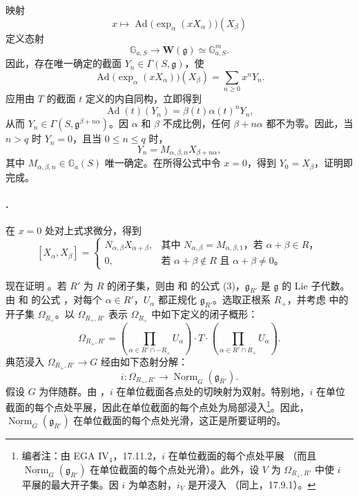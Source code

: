 映射
\[
  x\longmapsto
  \operatorname{Ad}\bigl(\exp_\alpha(xX_\alpha)\bigr)(X_\beta)
\]
定义态射
\[
  \mathbb G_{a,S}\longrightarrow
  \mathbf W(\mathfrak g)\simeq\mathbb G_{a,S}^{m}.
\]
因此，存在唯一确定的截面 \(Y_n\in\Gamma(S,\mathfrak g)\)，使
\[
  \operatorname{Ad}\bigl(\exp_\alpha(xX_\alpha)\bigr)(X_\beta)
  =
  \sum_{n\geq0}x^nY_n.
\]
应用由 \(T\) 的截面 \(t\) 定义的内自同构，立即得到
\[
  \operatorname{Ad}(t)(Y_n)
  =
  \beta(t)\alpha(t)^nY_n,
\]
从而 \(Y_n\in\Gamma(S,\mathfrak g^{\beta+n\alpha})\)。因 \(\alpha\) 和 \(\beta\) 不成比例，任何 \(\beta+n\alpha\) 都不为零。因此，当 \(n>q\) 时 \(Y_n=0\)，且当 \(0\leq n\leq q\) 时，
\[
  Y_n=M_{\alpha,\beta,n}X_{\beta+n\alpha},
\]
其中 \(M_{\alpha,\beta,n}\in\mathbb G_a(S)\) 唯一确定。在所得公式中令 \(x=0\)，得到 \(Y_0=X_\beta\)，证明即完成。

\paragraph{.}
在 \(x=0\) 处对上式求微分，得到
\[
  [X_\alpha,X_\beta]
  =
  \begin{cases}
    N_{\alpha,\beta}X_{\alpha+\beta},
      &\text{其中 \(N_{\alpha,\beta}=M_{\alpha,\beta,1}\)，若
        \(\alpha+\beta\in R\)，}\\
    0,
      &\text{若 \(\alpha+\beta\notin R\) 且
        \(\alpha+\beta\ne0\)。}
  \end{cases}
\]

现在证明 。若 \(R'\) 为 \(R\) 的闭子集，则由  和 的公式 \textup{(3)}，\(\mathfrak g_{R'}\) 是 \(\mathfrak g\) 的 Lie 子代数。由  和 的公式 \textup{}，对每个 \(\alpha\in R'\)，\(U_\alpha\) 都正规化 \(\mathfrak g_{R'}\)。选取正根系 \(R_+\)，并考虑  中的开子集 \(\Omega_{R_+}\)。以 \(\Omega_{R_+,R'}\) 表示 \(\Omega_{R_+}\) 中如下定义的闭子概形：
\[
  \Omega_{R_+,R'}
  =
  \left(
    \prod_{\alpha\in R'\cap -R_+}U_\alpha
  \right)
  \cdot T\cdot
  \left(
    \prod_{\alpha\in R'\cap R_+}U_\alpha
  \right).
\]
典范浸入 \(\Omega_{R_+,R'}\to G\) 经由如下态射分解：
\[
  i:\Omega_{R_+,R'}
  \longrightarrow
  \underline{\operatorname{Norm}}_G(\mathfrak g_{R'}).
\]
假设 \(G\) 为伴随群。由 ，\(i\) 在单位截面各点处的切映射为双射。特别地，\(i\) 在单位截面的每个点处平展，因此在单位截面的每个点处为局部浸入\footnote{编者注：由 EGA \(\mathrm{IV}_4\)，17.11.2，\(i\) 在单位截面的每个点处平展 \textup{（而且 \(\underline{\operatorname{Norm}}_G(\mathfrak g_{R'})\) 在单位截面的每个点处光滑）}。此外，设 \(V\) 为 \(\Omega_{R_+,R'}\) 中使 \(i\) 平展的最大开子集。因 \(i\) 为单态射，\(i_V\) 是开浸入 \textup{（同上，17.9.1）}。}。因此，\(\underline{\operatorname{Norm}}_G(\mathfrak g_{R'})\) 在单位截面的每个点处光滑，这正是所要证明的。

